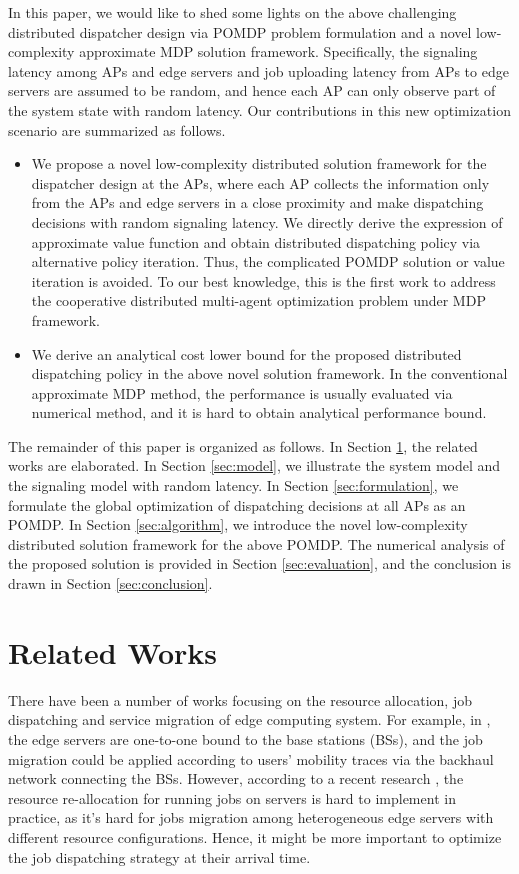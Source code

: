 In this paper, we would like to shed some lights on the above challenging distributed dispatcher design via POMDP problem formulation and a novel low-complexity approximate MDP solution framework.
Specifically, the signaling latency among APs and edge servers and job uploading latency from APs to edge servers are assumed to be random, and hence each AP can only observe part of the system state with random latency.
Our contributions in this new optimization scenario are summarized as follows.
\begin{itemize}
    \item We propose a novel low-complexity distributed solution framework for the dispatcher design at the APs, where each AP collects the information only from the APs and edge servers in a close proximity and make dispatching decisions with random signaling latency. We directly derive the expression of approximate value function and obtain distributed dispatching policy via alternative policy iteration. Thus, the complicated POMDP solution or value iteration is avoided. To our best knowledge, this is the first work to address the cooperative distributed multi-agent optimization problem under MDP framework.
    \item We derive an analytical cost lower bound for the proposed distributed dispatching policy in the above novel solution framework. In the conventional approximate MDP method, the performance is usually evaluated via numerical method, and it is hard to obtain analytical performance bound.
\end{itemize}

The remainder of this paper is organized as follows.
In Section \ref{sec:review}, the related works are elaborated.
In Section \ref{sec:model}, we illustrate the system model and the signaling model with random latency.
In Section \ref{sec:formulation}, we formulate the global optimization of dispatching decisions at all APs as an POMDP.
In Section \ref{sec:algorithm}, we introduce the novel low-complexity distributed solution framework for the above POMDP.
The numerical analysis of the proposed solution is provided in Section \ref{sec:evaluation}, and the conclusion is drawn in Section \ref{sec:conclusion}.

\section{Related Works}
\label{sec:review}
There have been a number of works focusing on the resource allocation, job dispatching and service migration of edge computing system.
For example, in \cite{TON19-WangSq}, the edge servers are one-to-one bound to the base stations (BSs), and the job migration could be applied according to users' mobility traces via the backhaul network connecting the BSs.
However, according to a recent research \cite{INFOCOM19-WuC}, the resource re-allocation for running jobs on servers is hard to implement in practice, as it's hard for jobs migration among heterogeneous edge servers with different resource configurations.
Hence, it might be more important to optimize the job dispatching strategy at their arrival time.

